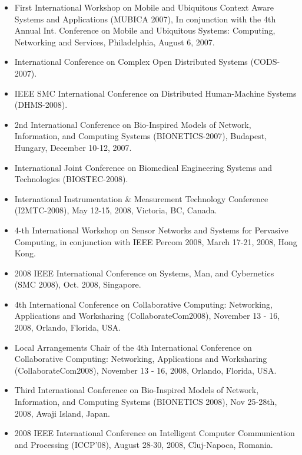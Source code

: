 \begin{itemize}
\item First International Workshop on Mobile and Ubiquitous Context Aware Systems and Applications (MUBICA 2007), In conjunction with the 4th Annual Int. Conference on Mobile and Ubiquitous Systems: Computing, Networking and Services, Philadelphia, August 6, 2007.

\item International Conference on Complex Open Distributed Systems (CODS-2007).

\item IEEE SMC International Conference on Distributed Human-Machine Systems (DHMS-2008).

\item 2nd International Conference on Bio-Inspired Models of Network, Information, and Computing Systems (BIONETICS-2007), Budapest, Hungary, December 10-12, 2007.

\item International Joint Conference on Biomedical Engineering Systems and Technologies (BIOSTEC-2008).

\item International Instrumentation \& Measurement Technology Conference (I2MTC-2008), May 12-15, 2008, Victoria, BC, Canada.

\item 4-th International Workshop on Sensor Networks and Systems for Pervasive Computing, in conjunction with IEEE Percom 2008, March 17-21, 2008, Hong Kong.

\item 2008 IEEE International Conference on Systems, Man, and Cybernetics (SMC 2008), Oct. 2008, Singapore.

\item 4th International Conference on Collaborative Computing: Networking, Applications and Worksharing (CollaborateCom2008), November 13 - 16, 2008, Orlando, Florida, USA.

\item Local Arrangements Chair of the 4th International
Conference on Collaborative Computing: Networking, Applications and
Worksharing (CollaborateCom2008), November 13 - 16, 2008, Orlando,
Florida, USA.


\item Third International
Conference on Bio-Inspired Models of Network, Information, and Computing
Systems (BIONETICS 2008),
Nov 25-28th, 2008, Awaji Island, Japan.

\item 2008 IEEE International
Conference on Intelligent Computer Communication
and Processing (ICCP'08), August 28-30, 2008, Cluj-Napoca, Romania.


\end{itemize}
